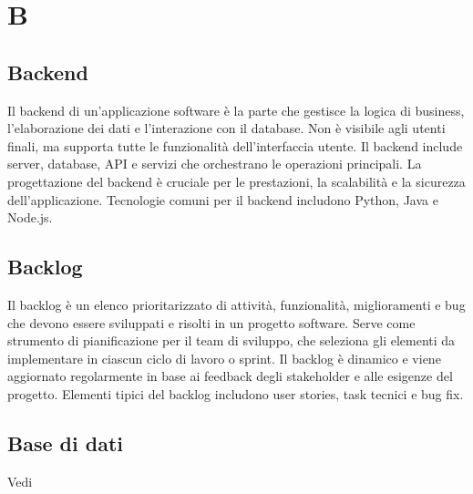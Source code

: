\section{B}

\vspace{2em}
\subsection*{Backend}
Il backend di un'applicazione software è la parte che gestisce la logica di business, l'elaborazione dei dati e l'interazione con il database. Non è visibile agli utenti finali, ma supporta tutte le funzionalità dell'interfaccia utente. Il backend include server, database, API e servizi che orchestrano le operazioni principali. La progettazione del backend è cruciale per le prestazioni, la scalabilità e la sicurezza dell'applicazione. Tecnologie comuni per il backend includono Python, Java e Node.js.

\vspace{2em}
\subsection*{Backlog}
Il backlog è un elenco prioritarizzato di attività, funzionalità, miglioramenti e bug che devono essere sviluppati e risolti in un progetto software. Serve come strumento di pianificazione per il team di sviluppo, che seleziona gli elementi da implementare in ciascun ciclo di lavoro o sprint. Il backlog è dinamico e viene aggiornato regolarmente in base ai feedback degli stakeholder e alle esigenze del progetto. Elementi tipici del backlog includono user stories, task tecnici e bug fix.

\vspace{2em}
\subsection*{Base di dati}
\par Vedi 

